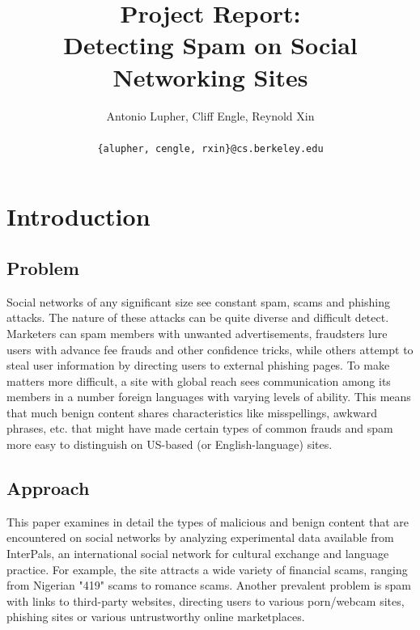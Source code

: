 \documentclass[preprint]{acm_proc_article-sp}
\begin{document}
\title{Project Report: \\
Detecting Spam on Social Networking Sites}

\author{
Antonio Lupher,
Cliff Engle,
Reynold Xin\\\\
\texttt{\{alupher, cengle, rxin\}@cs.berkeley.edu}
}

\maketitle

\section{Introduction}

\subsection{Problem}
Social networks of any significant size see constant spam, scams
and phishing attacks. The nature of these attacks can be quite diverse
and difficult detect. Marketers can spam members with unwanted
advertisements, fraudsters lure users with advance fee frauds and
other confidence tricks, while others attempt to steal user
information by directing users to external phishing pages. To make
matters more difficult, a site with global reach sees communication
among its members in a number foreign languages with varying levels
of ability. This means that much benign content shares characteristics
like misspellings, awkward phrases, etc. that might have made certain
types of common frauds and spam more easy to distinguish on US-based
(or English-language) sites.

\subsection{Approach}

This paper examines in detail the types of malicious and benign
content that are encountered on social networks by analyzing
experimental data available from InterPals, an international social network
for cultural exchange and language practice. For example, the site
attracts a wide variety of financial scams, ranging from Nigerian
"419" scams to romance scams. Another prevalent problem is spam with
links to third-party websites, directing users to various porn/webcam
sites, phishing sites or various untrustworthy online marketplaces.
\end{document}
